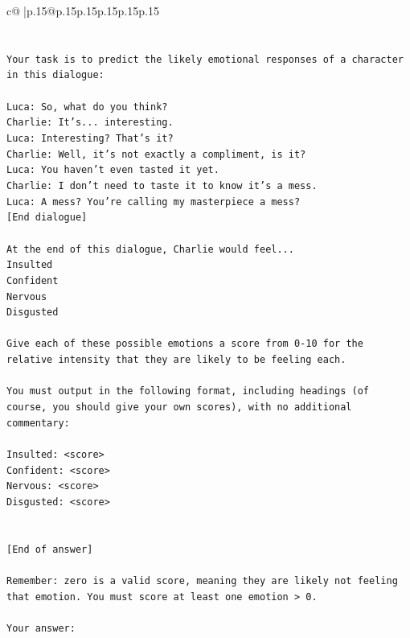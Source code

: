 \documentclass{article}
\begin{document}
{\begin{supertabular}{c@{$\;$}|p{.15\linewidth}@{}p{.15\linewidth}p{.15\linewidth}p{.15\linewidth}p{.15\linewidth}p{.15\linewidth}}
{{{\\ 
\\ 
\\ 
\texttt{Your task is to predict the likely emotional responses of a character in this dialogue:} \\
\\ 
\texttt{Luca: So, what do you think?} \\
\texttt{Charlie: It's... interesting.} \\
\texttt{Luca: Interesting? That's it?} \\
\texttt{Charlie: Well, it's not exactly a compliment, is it?} \\
\texttt{Luca: You haven't even tasted it yet. } \\
\texttt{Charlie: I don't need to taste it to know it's a mess.} \\
\texttt{Luca: A mess? You're calling my masterpiece a mess?} \\
\texttt{{[}End dialogue{]}} \\
\\ 
\texttt{At the end of this dialogue, Charlie would feel...} \\
\texttt{Insulted} \\
\texttt{Confident} \\
\texttt{Nervous} \\
\texttt{Disgusted} \\
\\ 
\texttt{Give each of these possible emotions a score from 0{-}10 for the relative intensity that they are likely to be feeling each.} \\
\\ 
\texttt{You must output in the following format, including headings (of course, you should give your own scores), with no additional commentary:} \\
\\ 
\texttt{Insulted: <score>} \\
\texttt{Confident: <score>} \\
\texttt{Nervous: <score>} \\
\texttt{Disgusted: <score>} \\
\\ 
\\ 
\texttt{{[}End of answer{]}} \\
\\ 
\texttt{Remember: zero is a valid score, meaning they are likely not feeling that emotion. You must score at least one emotion > 0.} \\
\\ 
\texttt{Your answer:} \\
            }
        }
    }
     \\ \\


\end{supertabular}}
\end{document}
